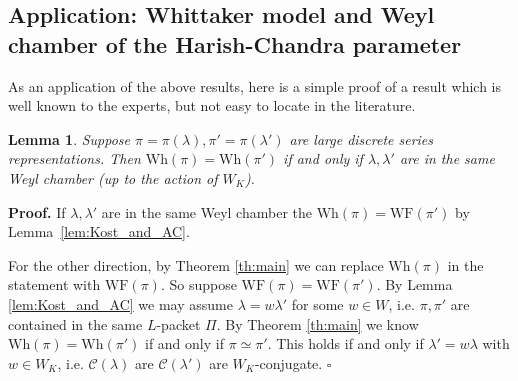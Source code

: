\documentclass[10pt,leqno]{article}
\newtheorem{lemma}[equation]{Lemma}
\newcommand{\qed}{\hfill $\square$ \medskip}
\newenvironment{proof}[1][Proof]{\noindent\textbf{#1.} }{\qed}
\newcommand{\Wh}{\mathrm{Wh}}
\newcommand{\WF}{\mathrm{WF}}
\begin{document}
\subsection{Application: Whittaker model and Weyl chamber of the Harish-Chandra parameter}

As an application of the above results, here is a simple proof of a result which is well known to the experts, but not easy to locate in the literature.

\begin{lemma}
\label{l:equalWhittaker}
Suppose $\pi=\pi(\lambda),\pi'=\pi(\lambda')$ are large discrete series
representations. Then $\Wh(\pi)=\Wh(\pi')$ if and only if
$\lambda,\lambda'$ are in the same Weyl chamber (up to the action of
$W_K$).
\end{lemma}

\begin{proof}
If $\lambda,\lambda'$ are in the same Weyl chamber the $\Wh(\pi)=\WF(\pi')$ by Lemma~\ref{lem:Kost_and_AC}.

For the other direction, by Theorem \ref{th:main} we can replace
$\Wh(\pi)$ in the statement with $\WF(\pi)$.  So suppose
$\WF(\pi)=\WF(\pi')$. By Lemma \ref{lem:Kost_and_AC} we may assume
$\lambda=w\lambda'$ for some $w\in W$, i.e. $\pi,\pi'$ are contained
in the same $L$-packet $\Pi$. By Theorem \ref{th:main} 
we know $\Wh(\pi)=\Wh(\pi')$ if and only if $\pi\simeq \pi'$.
This holds if and only if $\lambda'=w\lambda$ with $w\in W_K$, 
i.e. $\mathcal C(\lambda)$ are $\mathcal C(\lambda')$ are $W_K$-conjugate.
\end{proof}
\end{document}
